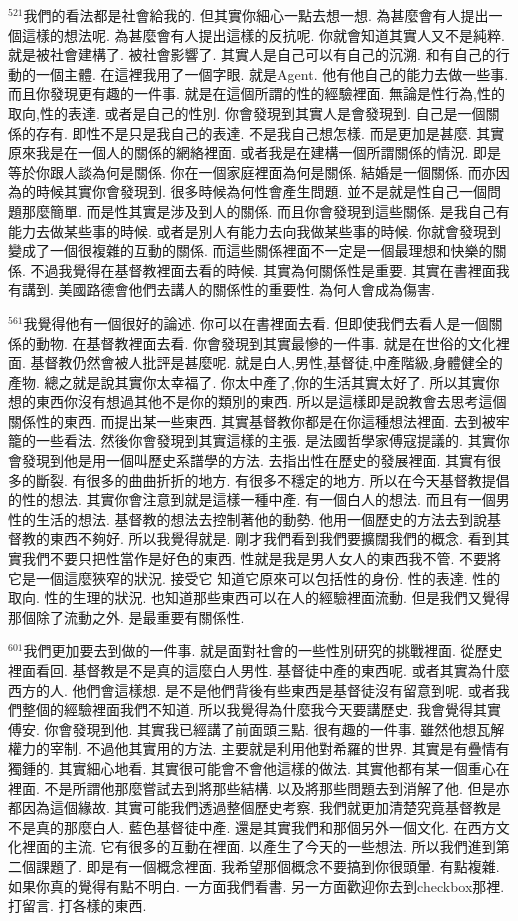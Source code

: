 \documentclass{book}
\begin{document}
$^{521}$我們的看法都是社會給我的.
但其實你細心一點去想一想.
為甚麼會有人提出一個這樣的想法呢.
為甚麼會有人提出這樣的反抗呢.
你就會知道其實人又不是純粹.
就是被社會建構了.
被社會影響了.
其實人是自己可以有自己的沉溯.
和有自己的行動的一個主體.
在這裡我用了一個字眼.
就是Agent.
他有他自己的能力去做一些事.
而且你發現更有趣的一件事.
就是在這個所謂的性的經驗裡面.
無論是性行為,性的取向,性的表達.
或者是自己的性別.
你會發現到其實人是會發現到.
自己是一個關係的存有.
即性不是只是我自己的表達.
不是我自己想怎樣.
而是更加是甚麼.
其實原來我是在一個人的關係的網絡裡面.
或者我是在建構一個所謂關係的情況.
即是等於你跟人談為何是關係.
你在一個家庭裡面為何是關係.
結婚是一個關係.
而亦因為的時候其實你會發現到.
很多時候為何性會產生問題.
並不是就是性自己一個問題那麼簡單.
而是性其實是涉及到人的關係.
而且你會發現到這些關係.
是我自己有能力去做某些事的時候.
或者是別人有能力去向我做某些事的時候.
你就會發現到變成了一個很複雜的互動的關係.
而這些關係裡面不一定是一個最理想和快樂的關係.
不過我覺得在基督教裡面去看的時候.
其實為何關係性是重要.
其實在書裡面我有講到.
美國路德會他們去講人的關係性的重要性.
為何人會成為傷害.

$^{561}$我覺得他有一個很好的論述.
你可以在書裡面去看.
但即使我們去看人是一個關係的動物.
在基督教裡面去看.
你會發現到其實最慘的一件事.
就是在世俗的文化裡面.
基督教仍然會被人批評是甚麼呢.
就是白人,男性,基督徒,中產階級,身體健全的產物.
總之就是說其實你太幸福了.
你太中產了,你的生活其實太好了.
所以其實你想的東西你沒有想過其他不是你的類別的東西.
所以是這樣即是說教會去思考這個關係性的東西.
而提出某一些東西.
其實基督教你都是在你這種想法裡面.
去到被牢籠的一些看法.
然後你會發現到其實這樣的主張.
是法國哲學家傅寇提議的.
其實你會發現到他是用一個叫歷史系譜學的方法.
去指出性在歷史的發展裡面.
其實有很多的斷裂.
有很多的曲曲折折的地方.
有很多不穩定的地方.
所以在今天基督教提倡的性的想法.
其實你會注意到就是這樣一種中產.
有一個白人的想法.
而且有一個男性的生活的想法.
基督教的想法去控制著他的動勢.
他用一個歷史的方法去到說基督教的東西不夠好.
所以我覺得就是.
剛才我們看到我們要擴闊我們的概念.
看到其實我們不要只把性當作是好色的東西.
性就是我是男人女人的東西我不管.
不要將它是一個這麼狹窄的狀況.
接受它 知道它原來可以包括性的身份.
性的表達.
性的取向.
性的生理的狀況.
也知道那些東西可以在人的經驗裡面流動.
但是我們又覺得那個除了流動之外.
是最重要有關係性.

$^{601}$我們更加要去到做的一件事.
就是面對社會的一些性別研究的挑戰裡面.
從歷史裡面看回.
基督教是不是真的這麼白人男性.
基督徒中產的東西呢.
或者其實為什麼西方的人.
他們會這樣想.
是不是他們背後有些東西是基督徒沒有留意到呢.
或者我們整個的經驗裡面我們不知道.
所以我覺得為什麼我今天要講歷史.
我會覺得其實傅安.
你會發現到他.
其實我已經講了前面頭三點.
很有趣的一件事.
雖然他想瓦解權力的宰制.
不過他其實用的方法.
主要就是利用他對希羅的世界.
其實是有疊情有獨鍾的.
其實細心地看.
其實很可能會不會他這樣的做法.
其實他都有某一個重心在裡面.
不是所謂他那麼嘗試去到將那些結構.
以及將那些問題去到消解了他.
但是亦都因為這個緣故.
其實可能我們透過整個歷史考察.
我們就更加清楚究竟基督教是不是真的那麼白人.
藍色基督徒中產.
還是其實我們和那個另外一個文化.
在西方文化裡面的主流.
它有很多的互動在裡面.
以產生了今天的一些想法.
所以我們進到第二個課題了.
即是有一個概念裡面.
我希望那個概念不要搞到你很頭暈.
有點複雜.
如果你真的覺得有點不明白.
一方面我們看書.
另一方面歡迎你去到checkbox那裡.
打留言.
打各樣的東西.
\end{document}
